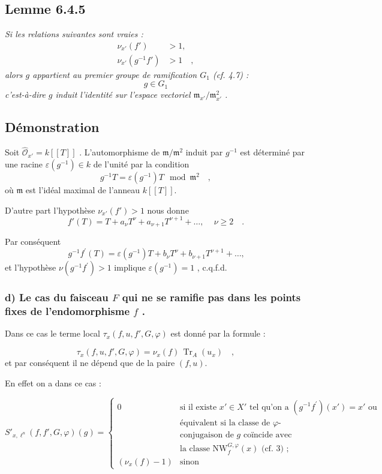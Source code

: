 \documentclass[11pt]{article}
\providecommand{\fm}{\mathfrak{m}}
\providecommand{\Tr}{\operatorname{Tr}}
\providecommand{\Tr}{\operatorname{Tr}}
\providecommand{\Tr}{\operatorname{Tr}}
\providecommand{\Tr}{\operatorname{Tr}}
\providecommand{\fm}{\mathfrak m}
\providecommand{\Tr}{\operatorname{Tr}}
\begin{document}
\subsection*{Lemme 6.4.5}
\emph{Si les relations suivantes sont vraies :}
\begin{align*}
\nu_{x'}(f') &> 1 \text{,} \\
\nu_{x'}(g^{-1}f') &> 1 \quad ,
\end{align*}
\emph{alors $g$ appartient au premier groupe de ramification $G_1$ (cf. 4.7) :}
\[
g \in G_1
\]
\emph{c'est-à-dire $g$ induit l'identité sur l'espace vectoriel $\fm_{x'}/\fm_{x'}^2$ .}

\subsection*{Démonstration}
Soit $\widehat{\mathcal{O}}_{x'} = k[[T]]$ . L'automorphisme de $\fm/\fm^2$ induit par $g^{-1}$ est déterminé par une racine $\varepsilon(g^{-1}) \in k$ de l'unité par la condition
\[
g^{-1}T = \varepsilon(g^{-1})T \mod \fm^2 \quad ,
\]
où $\fm$ est l'idéal maximal de l'anneau $k[[T]]$.

D'autre part l'hypothèse $\nu_{x'}(f') > 1$ nous donne
\[
f'(T) = T + a_\nu T^\nu + a_{\nu+1} T^{\nu+1} + \ldots \text{, } \quad \nu \geq 2 \quad .
\]

Par conséquent
\[
g^{-1}f^{\prime}(T) = \varepsilon(g^{-1})T + b_\nu T^\nu + b_{\nu+1} T^{\nu+1} + \ldots \text{,}
\]
et l'hypothèse $\nu(g^{-1}f^{\prime}) > 1$ implique $\varepsilon(g^{-1}) = 1$ , c.q.f.d.

\subsubsection*{d) Le cas du faisceau $F$ qui ne se ramifie pas dans les points fixes de l'endomorphisme $f$ .}

Dans ce cas le terme local $\tau_x(f,u, f', G, \varphi)$ est donné par la formule :

\begin{equation}\tag{6.4.6}
\tau_x(f,u, f', G, \varphi) = \nu_x(f) \, \Tr_A(u_x) \quad ,
\end{equation}
et par conséquent il ne dépend que de la paire $(f,u)$.

En effet on a dans ce cas :

\begin{equation}\tag{6.4.7}
S'_{x,\ell^n}(f, f', G, \varphi)(g) = \begin{cases}
0 & \text{si il existe } x' \in X' \text{ tel qu'on a } (g^{-1}f^{\prime})(x') = x' \text{ ou}\\
& \text{équivalent si la classe de $\varphi$-}\\
& \text{conjugaison de $g$ coïncide avec}\\
& \text{la classe } \mathrm{NW}_{f}^{G,\varphi}(x) \text{ (cf. 3) ;}\\
(\nu_x(f)-1) & \text{sinon}
\end{cases}
\end{equation}
\end{document}
